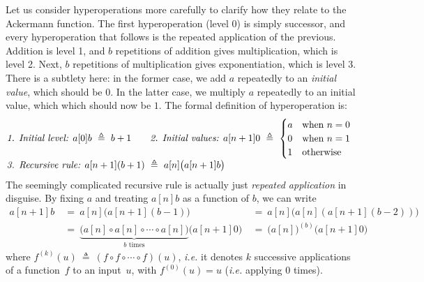 Let us consider hyperoperations more carefully
to clarify how they relate to the Ackermann function.
The first hyperoperation (level 0) is simply successor, and 
every hyperoperation that follows is the repeated application of the previous.
Addition is level 1, and $b$ repetitions of addition
gives multiplication, which is level 2. Next, $b$ repetitions of
multiplication gives exponentiation, which is level 3. 
There is a subtlety here: in the former case, we add $a$
repeatedly to an \emph{initial value}, which should be $0$.
In the latter case, we multiply $a$ repeatedly to an initial value, which 
which should now be $1$. The formal definition of hyperoperation is:
\begin{equation}
\label{eq:hyper}
\begin{array}{@{}l@{\qquad}l}
\textit{1. Initial level: } a[0]b ~ \triangleq ~ b + 1 &
\textit{2. Initial values: } a[n+1]0 ~ \triangleq ~
  \begin{cases}
    a & \text{when } n = 0 \\
    0 & \text{when } n = 1 \\
    1 & \text{otherwise}
  \end{cases} \\
\multicolumn{2}{@{}l}{\textit{3. Recursive rule: } a[n+1](b+1) ~ \triangleq ~ a[n]\big(a[n+1]b\big)}
\end{array}
\end{equation}
The seemingly complicated recursive rule is actually just \emph{repeated application} in disguise. By fixing $a$ and treating $a[n]b$ as a function of $b$, we can write
\begin{equation*}
\begin{array}{lll}
a[n+1]b & ~ = ~ a[n]\big(a[n+1](b-1)\big) & ~ = ~ a[n]\big(a[n](a[n+1](b-2))\big) \\
 & ~ = ~ \underbrace{\big( a[n]\circ a[n]\circ \cdots \circ a[n] \big)}_{b \text{ times}} \big(a[n+1]0\big) & ~ = ~ \big(a[n]\big)^{(b)}\big(a[n+1]0\big)
\end{array}
\end{equation*}
where $f^{(k)}(u) ~ \triangleq ~ (f\circ f\circ \cdots \circ f)(u)$, 
\emph{i.e.} it denotes $k$ successive applications of a function~$f$ to an 
input~$u$, with $f^{(0)}(u) = u$ (\emph{i.e.} applying $0$ times). 

